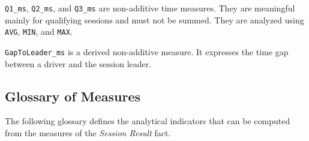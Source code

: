 \documentclass[a4paper,11pt]{article}
\begin{document}
	\texttt{Q1\_ms}, \texttt{Q2\_ms}, and \texttt{Q3\_ms} are non-additive time measures.
	They are meaningful mainly for qualifying sessions and must not be summed. They are
	analyzed using \texttt{AVG}, \texttt{MIN}, and \texttt{MAX}.
	
	\texttt{GapToLeader\_ms} is a derived non-additive measure. It expresses the time gap
	between a driver and the session leader. 
	
	\subsection{Glossary of Measures}
	
	The following glossary defines the analytical indicators that can be computed from the
	measures of the \textit{Session Result} fact.
	
\end{document}
